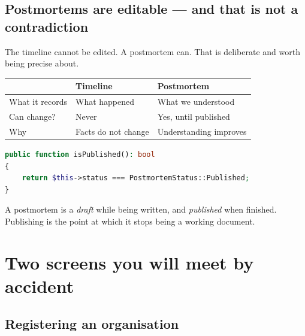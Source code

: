 \subsection{Postmortems are editable --- and that is not a contradiction}

The timeline cannot be edited. A postmortem can. That is deliberate and worth
being precise about.

\begin{center}
\begin{tabular}{@{}>{\raggedright\arraybackslash}p{3.4cm}>{\raggedright\arraybackslash}p{4.2cm}p{6.2cm}@{}}
\toprule
& \textbf{Timeline} & \textbf{Postmortem} \\
\midrule
What it records & What happened & What we understood \\
Can change? & Never & Yes, until published \\
Why & Facts do not change & Understanding improves \\
\bottomrule
\end{tabular}
\end{center}

\begin{lstlisting}[language=PHP]
public function isPublished(): bool
{
    return $this->status === PostmortemStatus::Published;
}
\end{lstlisting}

A postmortem is a \emph{draft} while being written, and \emph{published} when
finished. Publishing is the point at which it stops being a working document.


\section{Two screens you will meet by accident}

\subsection{Registering an organisation}


